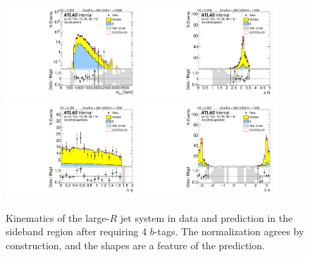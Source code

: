 \begin{figure}[htbp!]
\begin{center}
\includegraphics[angle=270, width=0.45\textwidth]{./figures/boosted/Sideband/b77_FourTag_Sideband_mHH_l_1.pdf}
\includegraphics[angle=270, width=0.45\textwidth]{./figures/boosted/Sideband/b77_FourTag_Sideband_hCandDr.pdf}\\
\includegraphics[angle=270, width=0.45\textwidth]{./figures/boosted/Sideband/b77_FourTag_Sideband_hCandDeta.pdf}
\includegraphics[angle=270, width=0.45\textwidth]{./figures/boosted/Sideband/b77_FourTag_Sideband_hCandDphi.pdf}
  \caption{Kinematics of the large-$R$ jet system in data and prediction in the sideband region after requiring 4 $b$-tags. The normalization agrees by construction, and the shapes are a feature of the prediction. }
  \label{fig:boosted-4b-sideband-ak10-system}
\end{center}
\end{figure}

